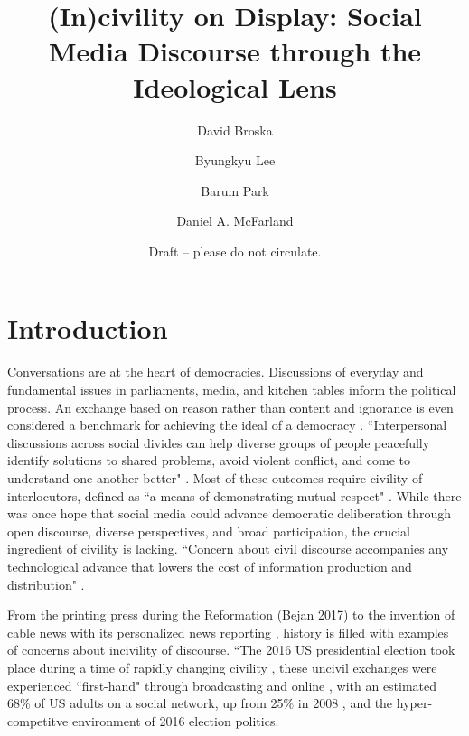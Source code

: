 \documentclass{article}
\date{Draft -- please do not circulate.}
\title{(In)civility on Display: Social Media Discourse through the Ideological Lens}
\author[1]{David Broska}
\author[2]{Byungkyu Lee}
\author[3]{Barum Park}
\author[4]{Daniel A. McFarland}
\affil[1,4]{Stanford University}
\affil[2]{New York University}
\affil[2]{Cornell University}
\begin{document}
\maketitle

\section{Introduction}

Conversations are at the heart of democracies. Discussions of everyday and fundamental issues in parliaments, media, and kitchen tables inform the political process. An exchange based on reason rather than content and ignorance is even considered a benchmark for achieving the ideal of a democracy \citep{sanders_against_1997}. ``Interpersonal discussions across social divides can help diverse groups of people peacefully identify solutions to shared problems, avoid violent conflict, and come to understand one another better" \citep{argyle_leveraging_2023}. Most of these outcomes require civility of interlocutors, defined as ``a means of demonstrating mutual respect" \citep{mutz_inyourface_2016}. While there was once hope that social media could advance democratic deliberation through open discourse, diverse perspectives, and broad participation, the crucial ingredient of civility is lacking. ``Concern about civil discourse accompanies any technological advance that lowers the cost of information production and distribution" \citep{munger_dont_2021}. 



From the printing press during the Reformation (Bejan 2017) to the invention of cable news with its personalized news reporting \citep{mutz_inyourface_2016,berry2014outrage}, history is filled with examples of concerns about incivility of discourse. ``The 2016 US presidential election took place during a time of rapidly changing civility \citep{munger_dont_2021}, these uncivil exchanges were experienced ``first-hand" through broadcasting and online 
\citep{mutz_inyourface_2016}, with an estimated 68\% of US adults on a social network, up from 25\% in 2008 \citep{duggan_social_2016}, and the hyper-competitve environment of 2016 election politics.




\end{document}
